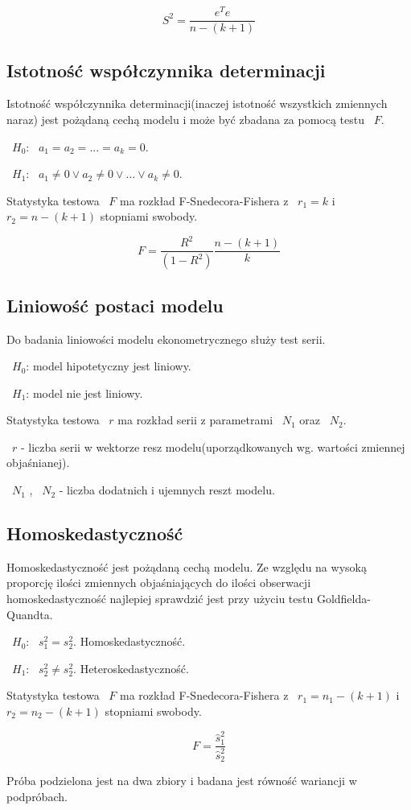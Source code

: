 \documentclass{article}
\begin{document}
\[S^2 = \frac{e^Te}{n - (k + 1)}\]

\newpage
\subsection{Istotność współczynnika determinacji}
Istotność współczynnika determinacji(inaczej istotność wszystkich zmiennych naraz) jest pożądaną cechą modelu i może być zbadana za pomocą testu ~$F$.

~$H_0$: ~$a_1 = a_2 = ... = a_k = 0$.

~$H_1$: ~$a_1 \neq 0 \vee a_2 \neq 0 \vee ... \vee a_k \neq 0$.

Statystyka testowa ~$F$ ma rozkład F-Snedecora-Fishera z ~$r_1 = k$ i ~$r_2 = n - (k + 1)$ stopniami swobody.

\[F = \frac{R^2}{(1-R^2)}\frac{n - (k + 1)}{k}\]

\subsection{Liniowość postaci modelu}
Do badania liniowości modelu ekonometrycznego służy test serii.

~$H_0$: model hipotetyczny jest liniowy.

~$H_1$: model nie jest liniowy.

Statystyka testowa ~$r$ ma rozkład serii z parametrami ~$N_1$ oraz ~$N_2$.

~$r$ - liczba serii w wektorze resz modelu(uporządkowanych wg. wartości zmiennej objaśnianej).

~$N_1$ , ~$N_2$ - liczba dodatnich i ujemnych reszt modelu.

\subsection{Homoskedastyczność}
Homoskedastyczność jest pożądaną cechą modelu. Ze względu na wysoką proporcję ilości zmiennych objaśniających do ilości obserwacji homoskedastyczność najlepiej sprawdzić jest przy użyciu testu Goldfielda-Quandta.

~$H_0$: ~$s_1^2 = s_2^2$. Homoskedastyczność.

~$H_1$: ~$s_2^2 \neq s_2^2$. Heteroskedastyczność.

Statystyka testowa ~$F$ ma rozkład F-Snedecora-Fishera z ~$r_1 = n_1 - (k+1)$ i ~$r_2 = n_2 - (k + 1)$ stopniami swobody.

\[F = \frac{\hat{s}_1^2}{\hat{s}_2^2}\]

Próba podzielona jest na dwa zbiory i badana jest równość wariancji w podpróbach.
\end{document}
